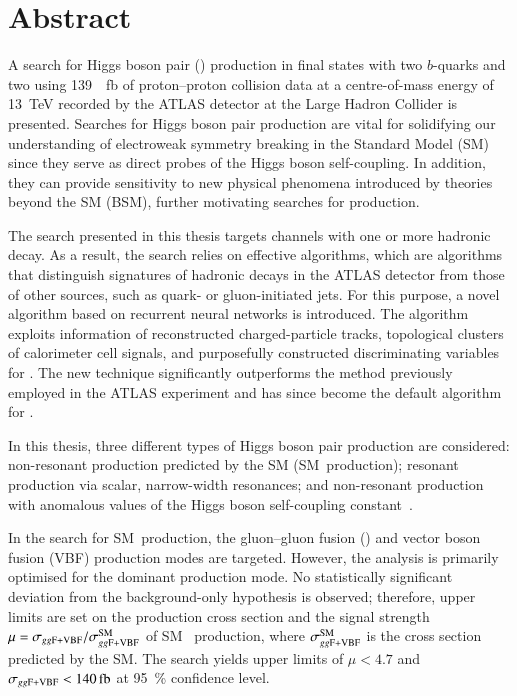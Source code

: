 \chapter*{Abstract}

A search for Higgs boson pair (\HH) production in final states with two
$b$-quarks and two \tauleptons using \SI{139}{\per\femto\barn} of proton--proton
collision data at a centre-of-mass energy of \SI{13}{\TeV} recorded by the ATLAS
detector at the Large Hadron Collider
is presented. Searches for Higgs boson pair production are vital for solidifying
our understanding of electroweak symmetry breaking in the Standard Model (SM)
since they serve as direct probes of the Higgs boson self-coupling. In addition,
they can provide sensitivity to new physical phenomena introduced by theories
beyond the SM (BSM), further motivating searches for \HH production.

The search presented in this thesis targets channels with one or more hadronic
\taulepton decay. As a result, the search relies on effective \tauid algorithms,
which are algorithms that distinguish signatures of hadronic \taulepton decays
in the ATLAS detector from those of other sources, such as quark- or
gluon-initiated jets. For this purpose, a novel \tauid algorithm based on
recurrent neural networks is introduced. The algorithm exploits information of
reconstructed charged-particle tracks, topological clusters of calorimeter cell
signals, and purposefully constructed discriminating variables for \tauid. The
new technique significantly outperforms the method previously employed in the
ATLAS experiment and has since become the default algorithm for \tauid.

In this thesis, three different types of Higgs boson pair production are
considered: non-resonant \HH production predicted by the SM (SM~\HH production);
resonant \HH production via scalar, narrow-width resonances; and non-resonant
\HH production with anomalous values of the Higgs boson self-coupling
constant~\lambdahhh.

In the search for SM~\HH production, the gluon--gluon fusion (\ggF) and vector
boson fusion (VBF) production modes are targeted. However, the analysis is
primarily optimised for the dominant \ggF production mode. No statistically
significant deviation from the background-only hypothesis is observed;
therefore, upper limits are set on the production cross section \xsecggfvbf and
the signal strength~$\mu = \sigma_{gg\text{F+VBF}} / \sigma_{gg\text{F+VBF}}^{\text{SM}}$ of SM~\HH
production, where $\sigma_{gg\text{F+VBF}}^{\text{SM}}$ is the cross section predicted by
the SM. The search yields upper limits of $\mu < \num{4.7}$ and
$\xsecggfvbf < \SI{140}{\femto\barn}$ at \SI{95}{\percent} confidence level.

